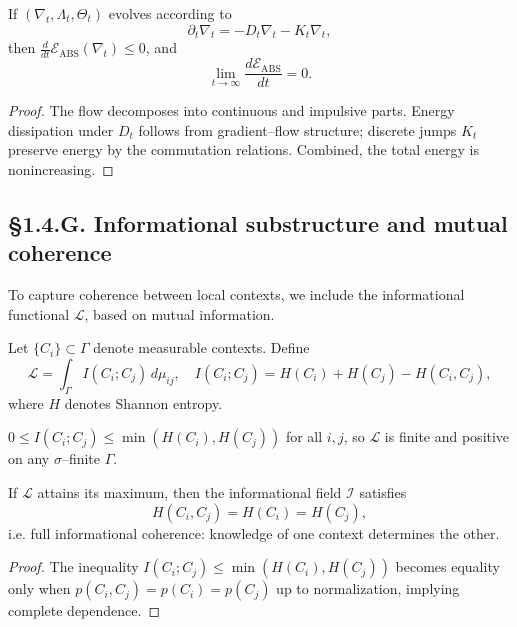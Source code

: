\begin{theorem}\label{thm:1.4.time}
If $(\nabla_t,\Lambda_t,\Theta_t)$ evolves according to
\[
\partial_t \nabla_t = -D_t \nabla_t - K_t \nabla_t,
\]
then $\frac{d}{dt}\mathcal E_{\mathrm{ABS}}(\nabla_t)\le0$, and
\[
\lim_{t\to\infty}\frac{d\mathcal E_{\mathrm{ABS}}}{dt}=0.
\]
\end{theorem}

\begin{proof}
The flow decomposes into continuous and impulsive parts.  
Energy dissipation under $D_t$ follows from gradient–flow structure; discrete jumps $K_t$ preserve energy by the commutation relations.  
Combined, the total energy is nonincreasing.
\end{proof}

\subsection*{§1.4.G. Informational substructure and mutual coherence}

To capture coherence between local contexts, we include the informational functional $\mathcal L$, based on mutual information.

\begin{definition}
Let $\{C_i\}\subset\Gamma$ denote measurable contexts.  
Define
\[
\mathcal L = \int_\Gamma I(C_i;C_j)\,d\mu_{ij},
\quad
I(C_i;C_j)=H(C_i)+H(C_j)-H(C_i,C_j),
\]
where $H$ denotes Shannon entropy.
\end{definition}

\begin{lemma}\label{lem:1.4.info}
$0\le I(C_i;C_j)\le \min(H(C_i),H(C_j))$ for all $i,j$, so $\mathcal L$ is finite and positive on any $\sigma$–finite $\Gamma$.
\end{lemma}

\begin{theorem}\label{thm:1.4.coherence}
If $\mathcal L$ attains its maximum, then the informational field $\mathcal I$ satisfies
\[
H(C_i,C_j)=H(C_i)=H(C_j),
\]
i.e. full informational coherence: knowledge of one context determines the other.
\end{theorem}

\begin{proof}
The inequality $I(C_i;C_j)\le\min(H(C_i),H(C_j))$ becomes equality only when $p(C_i,C_j)=p(C_i)=p(C_j)$ up to normalization, implying complete dependence.
\end{proof}

